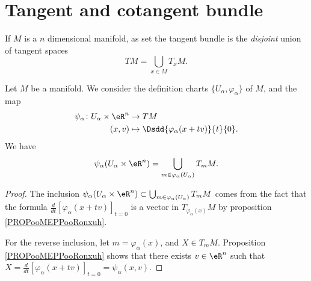 \section{Tangent and cotangent bundle}

If $M$ is a $n$ dimensional manifold, as set the tangent bundle is the \emph{disjoint} union of tangent spaces
\begin{equation}
	TM=\bigcup_{x\in M}T_xM.
\end{equation}


\begin{lemma}	\label{LEMooLZVTooSvHmjn}
	Let \( M\) be a manifold. We consider the definition charts \( \{ U_{\alpha}, \varphi_{\alpha} \}\) of \( M\), and the map
	\begin{equation}
		\begin{aligned}
			\psi_{\alpha}\colon U_{\alpha}\times \eR^n & \to TM                                         \\
			(x,v)                                      & \mapsto \Dsdd{ \varphi_{\alpha}(x+tv) }{t}{0}.
		\end{aligned}
	\end{equation}
	We have
	\begin{equation}
		\psi_{\alpha}(U_{\alpha}\times \eR^n)=\bigcup_{m\in\varphi_{\alpha}(U_{\alpha})}T_mM.
	\end{equation}
\end{lemma}

\begin{proof}
	The inclusion \( \psi_{\alpha}(U_{\alpha}\times \eR^n)\subset\bigcup_{m\in\varphi_{\alpha}(U_{\alpha})}T_mM\) comes from the fact that the formula \( \frac{d}{dt} \left[ \varphi_{\alpha}(x+tv)  \right]_{t=0}\) is a vector in \( T_{\varphi_{\alpha}(x)}M\) by proposition \ref{PROPooMEPPooRonxuh}.

	For the reverse inclusion, let \( m=\varphi_{\alpha}(x)\), and \( X\in T_mM\). Proposition \ref{PROPooMEPPooRonxuh} shows that there exists \( v\in \eR^n\) such that \( X=\frac{d}{dt} \left[ \varphi_{\alpha}(x+tv)  \right]_{t=0}=\psi_{\alpha}(x,v)\).
\end{proof}


